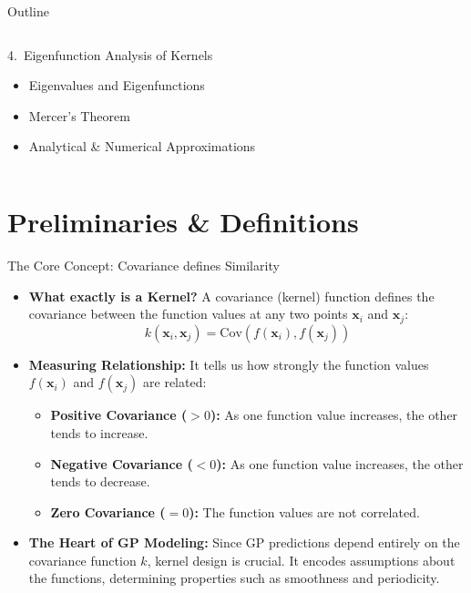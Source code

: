 \documentclass[aspectratio=169, 10pt]{beamer}
\newcommand{\bx}{\mathbf{x}}
\begin{document}
\begin{frame}{Outline}
\begin{columns}[t]
      \begin{block}{4.\ Eigenfunction Analysis of Kernels}
        \scriptsize
        \begin{itemize}\setlength\itemsep{0pt}
          \item Eigenvalues and Eigenfunctions
          \item Mercer's Theorem
          \item Analytical \& Numerical Approximations
        \end{itemize}
      \end{block}
  \end{columns}
\end{frame}

\section{Preliminaries \& Definitions}

\begin{frame}{The Core Concept: Covariance defines Similarity}
  
  \begin{itemize}
    \item \textbf{What exactly is a Kernel?} A covariance (kernel) function defines the covariance between the function values at any two points $\bx_i$ and $\bx_j$:
      \[
        k(\bx_i, \bx_j) = \text{Cov}(f(\bx_i), f(\bx_j))
      \]
      
    \item \textbf{Measuring Relationship:} It tells us how strongly the function values $f(\bx_i)$ and $f(\bx_j)$ are related:
      \begin{itemize}
        \item \textbf{Positive Covariance ($>0$):} As one function value increases, the other tends to increase.
        \item \textbf{Negative Covariance ($<0$):} As one function value increases, the other tends to decrease.
        \item \textbf{Zero Covariance ($=0$):} The function values are not correlated.
      \end{itemize}
      
    \item \textbf{The Heart of GP Modeling:} Since GP predictions depend entirely on the covariance function $k$, kernel design is crucial. It encodes assumptions about the functions, determining properties such as smoothness and periodicity.
  \end{itemize}
\end{frame}
\end{document}
